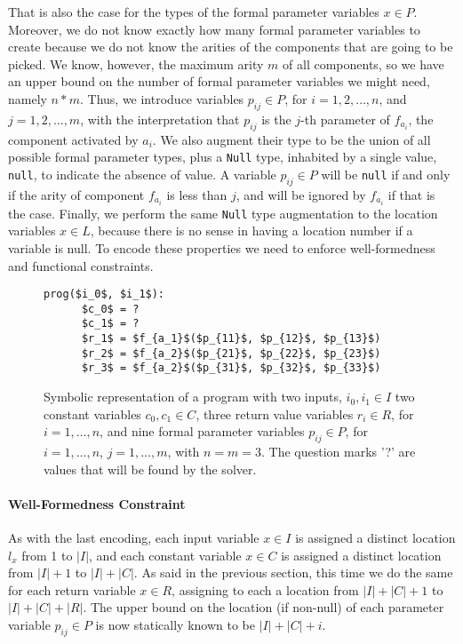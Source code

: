 That is also the case for the types of the formal parameter variables $x \in P$.
Moreover, we do not know exactly how many formal parameter variables to create
because we do not know the arities of the components that are going to be picked.
We know, however, the maximum arity $m$ of all components, so we have an upper
bound on the number of formal parameter variables we might need, namely
$n * m$.
Thus, we introduce variables $p_{ij} \in P$, for $i = 1, 2, \ldots, n$, and
$j = 1, 2, \ldots, m$, with the interpretation that $p_{ij}$ is the $j$-th
parameter of $f_{a_i}$, the component activated by $a_i$.
We also augment their type to be the union of all possible formal parameter
types, plus a \lstinline{Null} type, inhabited by a single value,
\lstinline{null}, to indicate the absence of value.
A variable $p_{ij} \in P$ will be \lstinline{null} if and only if the arity of
component $f_{a_i}$ is less than $j$, and will be ignored by $f_{a_i}$ if that
is the case.
Finally, we perform the same \lstinline{Null} type augmentation to the location
variables $x \in L$, because there is no sense in having a location number if a
variable is null.
To encode these properties we need to enforce well-formedness and functional
constraints.

\begin{figure}
  \begin{lstlisting}[frame=tlrb,mathescape=true]
    prog($i_0$, $i_1$):
      $c_0$ = ?
      $c_1$ = ?
      $r_1$ = $f_{a_1}$($p_{11}$, $p_{12}$, $p_{13}$)
      $r_2$ = $f_{a_2}$($p_{21}$, $p_{22}$, $p_{23}$)
      $r_3$ = $f_{a_2}$($p_{31}$, $p_{32}$, $p_{33}$)
  \end{lstlisting}
\caption{Symbolic representation of a program with two inputs, $i_0, i_1 \in I$
  two constant variables $c_0, c_1 \in C$, three return value variables $r_i \in
  R$, for $i = 1, \ldots, n$, and nine formal parameter variables $p_{ij} \in
  P$, for $i = 1, \ldots, n$, $j = 1, \ldots, m$, with $n = m = 3$.
  The question marks '?' are values that will be found by the solver.}
\label{fig:whole-encoding-prog}
\end{figure}

\paragraph{Well-Formedness Constraint}
\label{sec:whole-well-formedness-constraint}

As with the last encoding, each input variable $x \in I$ is assigned a distinct
location $l_x$ from 1 to $|I|$, and each constant variable $x \in C$ is assigned
a distinct location from $|I| + 1$ to $|I| + |C|$.
As said in the previous section, this time we do the same for each return
variable $x \in R$, assigning to each a location from $|I| + |C| + 1$ to
$|I| + |C| + |R|$.
The upper bound on the location (if non-null) of each parameter variable $p_{ij}
\in P$ is now statically known to be $|I| + |C| + i$.

